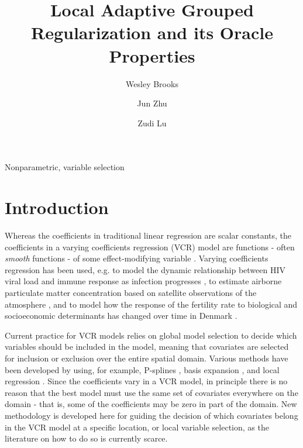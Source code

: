 \documentclass[authoryear,review, 12pt]{elsarticle}
\begin{document}
\begin{frontmatter}

\title{Local Adaptive Grouped Regularization and its Oracle Properties}


\author[wrbrooks]{Wesley Brooks}

\author[jzhu]{Jun Zhu}

\author[zlu]{Zudi Lu}

\address[wrbrooks]{Department of Statistics, University of Wisconsin, Madison, WI 53706}
\address[jzhu]{Department of Statistics and Department of Entomology, University of Wisconsin, Madison, WI 53706}
\address[zlu]{School of Mathematical Sciences, The University of Southampton Highfield, Southampton UK}

\begin{abstract}

\end{abstract}

\begin{keyword}
Nonparametric, variable selection
\end{keyword}

\end{frontmatter}

\section{Introduction}

Whereas the coefficients in traditional linear regression are scalar
constants, the coefficients in a varying coefficients regression (VCR)
model are functions - often \emph{smooth} functions - of some effect-modifying
variable \citep{Cleveland-Grosse-1991,Hastie-Tibshirani-1993}. Varying
coefficients regression has been used, e.g. to model the dynamic relationship
between HIV viral load and immune response as infection progresses
\citep{Liang-Wu-Carroll-2003}, to estimate airborne particulate matter
concentration based on satellite observations of the atmosphere \citep{Pelletier-Santer-Vidot-2007},
and to model how the response of the fertility rate to biological
and socioeconomic determinants has changed over time in Denmark \citep{Kohler-Rodgers-Christensen-2003}.

Current practice for VCR models relies on global model selection to
decide which variables should be included in the model, meaning that
covariates are selected for inclusion or exclusion over the entire
spatial domain. Various methods have been developed by using, for
example, P-splines \citep{Antoniadis:2012a}, basis expansion \citep{Wang-2008a},
and local regression \citep{Wang-Xia-2009}. Since the coefficients
vary in a VCR model, in principle there is no reason that the best
model must use the same set of covariates everywhere on the domain
- that is, some of the coefficients may be zero in part of the domain.
New methodology is developed here for guiding the decision of which
covariates belong in the VCR model at a specific location, or local
variable selection, as the literature on how to do so is currently
scarce.
\end{document}
